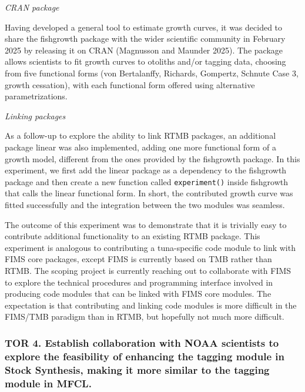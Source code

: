 \documentclass{SCreport}
\begin{document}
\vspace{0.5ex}

\textit{CRAN package}

\vspace{-1ex}

Having developed a general tool to estimate growth curves, it was decided to
share the \textsf{fishgrowth} package with the wider scientific community in
February 2025 by releasing it on CRAN (Magnusson and Maunder 2025). The package
allows scientists to fit growth curves to otoliths and/or tagging data, choosing
from five functional forms (von Bertalanffy, Richards, Gompertz, Schnute Case 3,
growth cessation), with each functional form offered using alternative
parametrizations.

\vspace{0.5ex}

\textit{Linking packages}

\vspace{-1ex}

As a follow-up to explore the ability to link RTMB packages, an additional
package \textsf{linear} was also implemented, adding one more functional form of
a growth model, different from the ones provided by the \textsf{fishgrowth}
package. In this experiment, we first add the \textsf{linear} package as a
dependency to the \textsf{fishgrowth} package and then create a new function
called \texttt{experiment()} inside \textsf{fishgrowth} that calls the
\textsf{linear} functional form. In short, the contributed growth curve was
fitted successfully and the integration between the two modules was seamless.

The outcome of this experiment was to demonstrate that it is trivially easy to
contribute additional functionality to an existing RTMB package. This experiment
is analogous to contributing a tuna-specific code module to link with FIMS core
packages, except FIMS is currently based on TMB rather than RTMB. The scoping
project is currently reaching out to collaborate with FIMS to explore the
technical procedures and programming interface involved in producing code
modules that can be linked with FIMS core modules. The expectation is that
contributing and linking code modules is more difficult in the FIMS/TMB paradigm
than in RTMB, but hopefully not much more difficult.

\vspace{0ex}

\subsubsection{TOR 4. Establish collaboration with NOAA scientists to explore
  the feasibility of enhancing the tagging module in Stock Synthesis, making it
  more similar to the tagging module in MFCL.}
\end{document}
